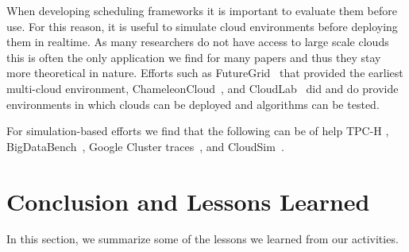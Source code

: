 \documentclass[final,5p,times,twocolumn]{elsarticle}
\begin{document}
When developing scheduling frameworks it is important to evaluate them
before use. For this reason, it is useful to simulate cloud
environments before deploying them in realtime. As many researchers do
not have access to large scale clouds this is often the only
application we find for many papers and thus they stay more
theoretical in nature. Efforts such as
FutureGrid~\cite{las12fg-bookchapter} that provided
the earliest multi-cloud environment,
ChameleonCloud~\cite{Chameleoncloud2019}, and
CloudLab~\cite{www-cloudlab} did and do provide environments in which
clouds can be deployed and algorithms can be tested.

For simulation-based efforts we find that the following can be of help
TPC-H \cite{www-tpc-h}, BigDataBench~\cite{bigdatabench}, Google
Cluster traces~\cite{www-google-cluster-traces},
and CloudSim~\cite{www-cloudsim}.





\section{Conclusion and Lessons Learned}\label{sec:conclusion}



In this section, we summarize some of the lessons we learned from our activities.
\end{document}
